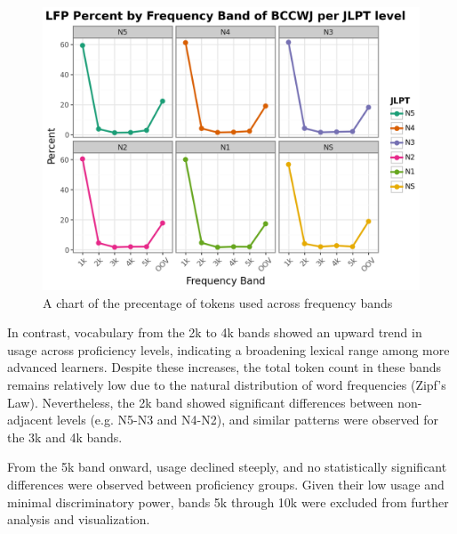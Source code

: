 \begin{figure}[htbp]
    \centering
    \includegraphics[scale=.4]{img/LFP/percentBands}
    \caption[A chart of the distribution of the average percent of tokens used across frequency band]{A chart of the precentage of tokens used across frequency bands}
    \label{fig:percentBands}
\end{figure}

In contrast, vocabulary from the 2k to 4k bands showed an upward trend in usage across proficiency levels,
indicating a broadening lexical range among more advanced learners. Despite these increases, the total token count
in these bands remains relatively low due to the natural distribution of word frequencies (Zipf's Law).
Nevertheless, the 2k band showed significant differences between non-adjacent levels (e.g. N5-N3 and N4-N2), and
similar patterns were observed for the 3k and 4k bands.

From the 5k band onward, usage declined steeply, and no statistically
significant differences were observed between proficiency groups. Given their low usage and minimal discriminatory
power, bands
5k through 10k were excluded from further analysis and visualization.


